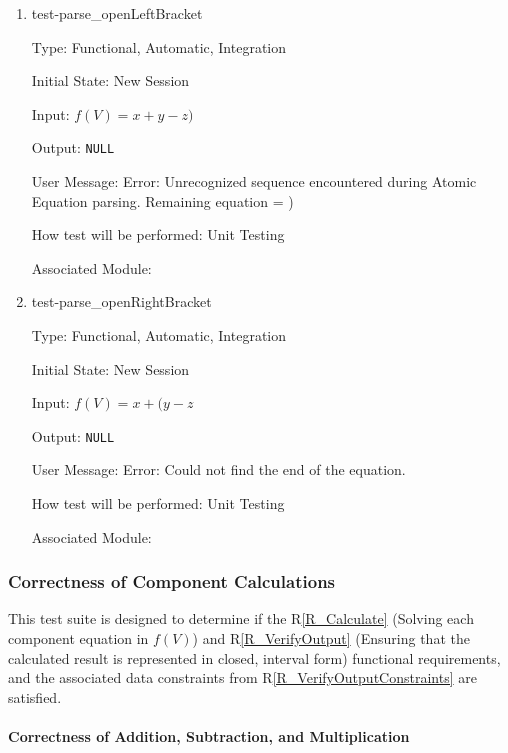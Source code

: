 \documentclass[12pt, titlepage]{article}
\newcommand{\rref}[1]{R\ref{#1}}
\begin{document}
\begin{enumerate}
	
	\item{test-parse\_openLeftBracket}
	
	Type: Functional, Automatic, Integration
	
	Initial State: New Session
	
	Input: $f(V) = x + y - z)$
	
	Output: \texttt{NULL}
	
	User Message: Error: Unrecognized sequence encountered during Atomic 
	Equation parsing. Remaining equation = )
	
	How test will be performed: Unit Testing
	
	Associated Module: \\
	
	\item{test-parse\_openRightBracket}
	
	Type: Functional, Automatic, Integration
	
	Initial State: New Session
	
	Input: $f(V) = x + (y - z$
	
	Output: \texttt{NULL}
	
	User Message: Error: Could not find the end of the equation.
	
	How test will be performed: Unit Testing
	
	Associated Module: \\
	
\end{enumerate}

\subsubsection{Correctness of Component Calculations}
\label{tests_correctnessOfCalculations}
This test suite is designed to determine if the \rref{R_Calculate} 
(Solving each component equation in $f(V)$) and \rref{R_VerifyOutput} (Ensuring 
that the calculated result is represented in closed, interval form) functional 
requirements, and the associated data constraints from 
\rref{R_VerifyOutputConstraints} are satisfied.

\paragraph{Correctness of Addition, Subtraction, and Multiplication}
\end{document}
